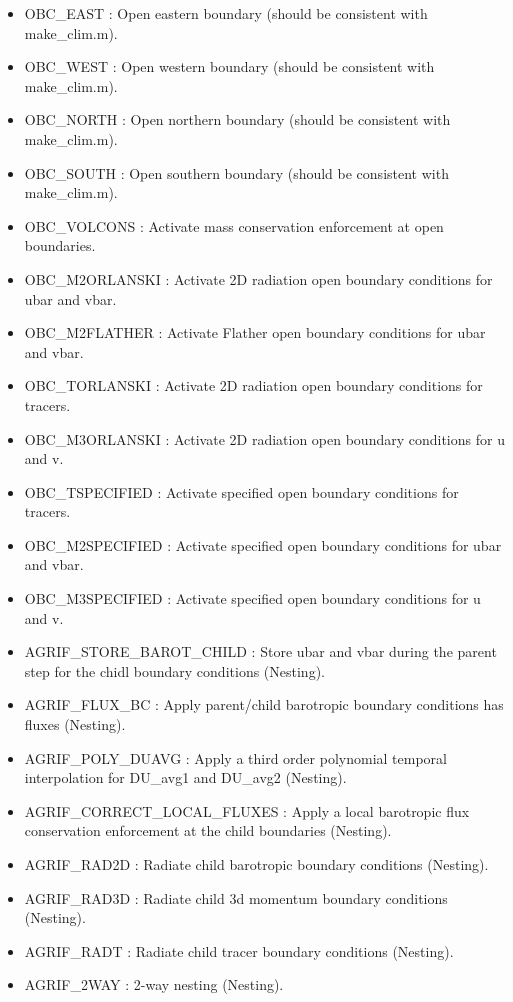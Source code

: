 \begin{itemize}
\item OBC\_EAST : Open eastern boundary (should be consistent with make\_clim.m).
\item OBC\_WEST : Open western boundary (should be consistent with make\_clim.m).
\item OBC\_NORTH : Open northern boundary (should be consistent with make\_clim.m).
\item OBC\_SOUTH : Open southern boundary (should be consistent with make\_clim.m).

\item OBC\_VOLCONS : Activate mass conservation enforcement at open boundaries.
\item OBC\_M2ORLANSKI : Activate 2D radiation open boundary conditions for ubar and vbar.
\item OBC\_M2FLATHER :  Activate Flather open boundary conditions for ubar and vbar.
\item OBC\_TORLANSKI :  Activate 2D radiation open boundary conditions for tracers.
\item OBC\_M3ORLANSKI : Activate 2D radiation open boundary conditions for u and v.

\item OBC\_TSPECIFIED : Activate specified open boundary conditions for tracers.
\item OBC\_M2SPECIFIED : Activate specified open boundary conditions for ubar and vbar.
\item OBC\_M3SPECIFIED : Activate specified open boundary conditions for u and v.

\item AGRIF\_STORE\_BAROT\_CHILD : Store ubar and vbar during the parent step for the
chidl boundary conditions (Nesting).
\item AGRIF\_FLUX\_BC : Apply parent/child barotropic boundary conditions has 
fluxes (Nesting).
\item AGRIF\_POLY\_DUAVG : Apply a third order polynomial temporal interpolation 
for DU\_avg1 and DU\_avg2 (Nesting).
\item AGRIF\_CORRECT\_LOCAL\_FLUXES  : Apply a local barotropic flux conservation 
enforcement at the child boundaries (Nesting).
\item AGRIF\_RAD2D : Radiate child barotropic boundary conditions (Nesting).
\item AGRIF\_RAD3D : Radiate child 3d momentum boundary conditions (Nesting).
\item AGRIF\_RADT : Radiate child tracer boundary conditions (Nesting).
\item AGRIF\_2WAY : 2-way nesting (Nesting).


\end{itemize}
